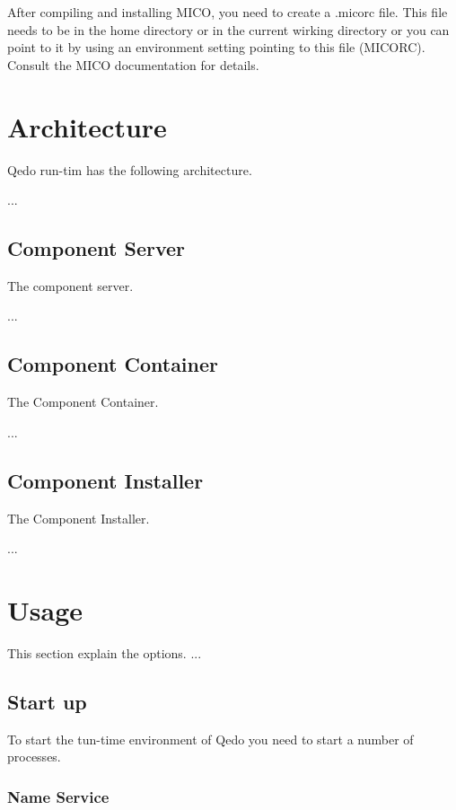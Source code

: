 \documentclass[12pt,a4paper]{report}
\begin{document}
After compiling and installing MICO, you need to create a .micorc file. This file needs to be in the home directory or in the current wirking directory or you can point to it by using an environment setting pointing to this file (MICORC). Consult the MICO documentation for details.


\chapter{Architecture}
\label{sec:Architecture}
Qedo run-tim has the following architecture.

 ...

\section{Component Server}
\label{sec:AComponentServer}
The component server. 

 ... 

\section{Component Container}
\label{sec:ComponentContainer}
The Component Container. 

...

\section{Component Installer}
\label{sec:ComponentInstaller}
The Component Installer.

...

\chapter{Usage}
\label{sec:Usage}
This section explain the options. ...

\section{Start up}
\label{sec:StartUp}
To start the tun-time environment of Qedo you need to start a number of processes. 

\subsection{Name Service}
\label{sec:NameService}
\end{document}
